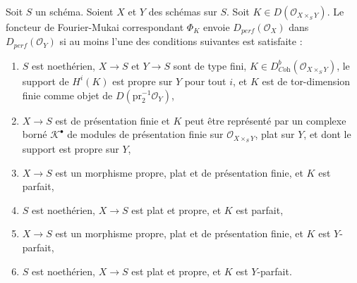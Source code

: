 \begin{lemma}
\label{lemma-fourier-mukai}
Soit $S$ un schéma. Soient $X$ et $Y$ des schémas sur $S$.
Soit $K \in D(\mathcal{O}_{X \times_S Y})$.
Le foncteur de Fourier-Mukai correspondant $\Phi_K$ envoie
$D_{perf}(\mathcal{O}_X)$ dans $D_{perf}(\mathcal{O}_Y)$ si au moins
l'une des conditions suivantes est satisfaite :
\begin{enumerate}
\item $S$ est noethérien, $X \to S$ et $Y \to S$ sont de type fini,
$K \in D^b_{\textit{Coh}}(\mathcal{O}_{X \times_S Y})$, le support de $H^i(K)$
est propre sur $Y$ pour tout $i$, et $K$ est de tor-dimension finie
comme objet de $D(\text{pr}_2^{-1}\mathcal{O}_Y)$,
\item $X \to S$ est de présentation finie et $K$ peut être représenté
par un complexe borné $\mathcal{K}^\bullet$ de modules de présentation finie sur
$\mathcal{O}_{X \times_S Y}$, plat sur $Y$, et dont le support
est propre sur $Y$,
\item $X \to S$ est un morphisme propre, plat et de présentation finie,
et $K$ est parfait,
\item $S$ est noethérien, $X \to S$ est plat et propre, et $K$ est parfait,
\item $X \to S$ est un morphisme propre, plat et de présentation finie,
et $K$ est $Y$-parfait,
\item $S$ est noethérien, $X \to S$ est plat et propre, et $K$ est
$Y$-parfait.
\end{enumerate}
\end{lemma}

